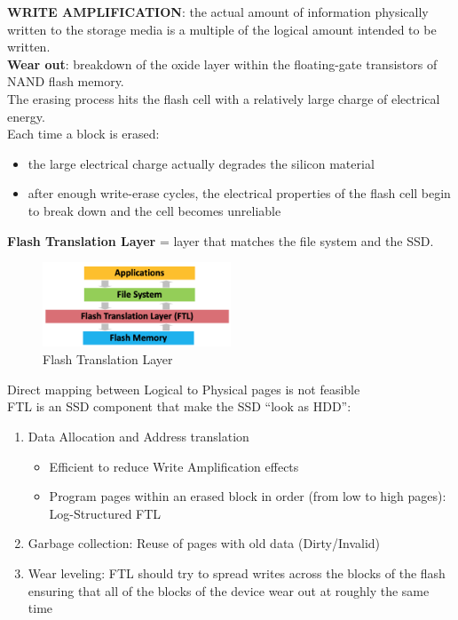 \documentclass[10pt, oneside]{article}
\begin{document}
{\bf WRITE AMPLIFICATION}: the actual amount of information physically written to the storage media is a multiple of the logical amount intended to be written.\\
\newline
{\bf Wear out}: breakdown of the oxide layer within the floating-gate transistors of NAND flash memory.\\
The erasing process hits the flash cell with a relatively large charge of electrical energy.\\
Each time a block is erased:
\begin{itemize}
    \item the large electrical charge actually degrades the silicon material
    \item after enough write-erase cycles, the electrical properties of the flash cell begin to break down and the cell becomes unreliable
\end{itemize}
{\bf Flash Translation Layer} = layer that matches the file system and the SSD.\\
\begin{multicols}{2}
\begin{figure}[H]
    \begin{center}
    \includegraphics[width=0.5\textwidth]{img/img15.png}
    \caption{Flash Translation Layer}
    \label{fig:FTL}
    \end{center}
\end{figure}
\columnbreak
Direct mapping between Logical to Physical pages is not feasible\\
FTL is an SSD component that make the SSD “look as HDD”:
\begin{enumerate}
    \item Data Allocation and Address translation
    \begin{itemize}
        \item Efficient to reduce Write Amplification effects
        \item Program pages within an erased block in order (from low to high pages): Log-Structured FTL
    \end{itemize}
    \item Garbage collection: Reuse of pages with old data (Dirty/Invalid)
    \item  Wear leveling: FTL should try to spread writes across the blocks of the flash ensuring that all of the blocks of the device wear out at roughly the same time
\end{enumerate}
\end{multicols}
\end{document}
